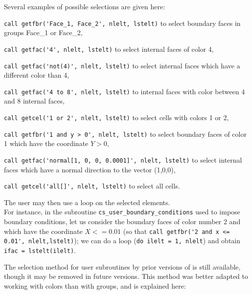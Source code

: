 {{{Several examples of possible selections are given here:
\begin{list}{-}{}
\item \verb+call getfbr('Face_1, Face_2', nlelt, lstelt)+ to select
  boundary faces in groups Face\_1 or Face\_2,
\item \verb+call getfac('4', nlelt, lstelt)+ to select internal
  faces of color 4,
\item \verb+call getfac('not(4)', nlelt, lstelt)+ to select internal
  faces which have a different color than 4,
\item \verb+call getfac('4 to 8', nlelt, lstelt)+ to internal faces
with color between 4 and 8 internal faces,
\item \verb+call getcel('1 or 2', nlelt, lstelt)+ to select cells
  with colors 1 or 2,
\item \verb+call getfbr('1 and y > 0', nlelt, lstelt)+ to select boundary
  faces of color 1 which have the coordinate $Y > 0$,
\item \verb+call getfac('normal[1, 0, 0, 0.0001]', nlelt, lstelt)+ to select
internal faces which have a normal direction to the vector (1,0,0),
\item \verb+call getcel('all[]', nlelt, lstelt)+ to select all cells.
\end{list}

The user may then use a loop on the selected elements.\\
For instance, in the subroutine \texttt{cs\_user\_boundary\_conditions} used to impose
boundary  conditions, let us consider the boundary faces of color
number 2 and which have the coordinate $X <= 0.01$
(so that \verb+call getfbr('2 and x <= 0.01', nlelt,lstelt)+);
we can do a loop (\verb+do ilelt = 1, nlelt+) and
obtain \verb+ifac = lstelt(ilelt)+.


The selection method for user subroutines by prior versions of \CS
is still available, though it may be removed in future versions.
This method was better adapted to working with colors than with groups,
and is explained here:

}}}
